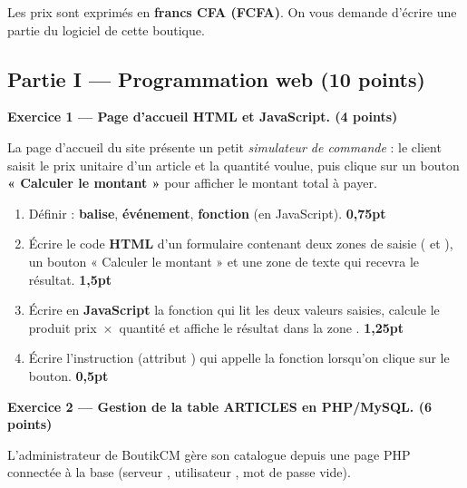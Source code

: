 \noindent Les prix sont exprimés en \textbf{francs CFA (FCFA)}. On vous demande
d'écrire une partie du logiciel de cette boutique.

\subsection*{Partie I — Programmation web \hfill (10 points)}

\textbf{Exercice 1 — Page d'accueil HTML et JavaScript. \hfill (4 points)}

\smallskip
La page d'accueil du site présente un petit \emph{simulateur de commande} : le client
saisit le prix unitaire d'un article et la quantité voulue, puis clique sur un bouton
\textbf{« Calculer le montant »} pour afficher le montant total à payer.

\begin{enumerate}[label=\textbf{\arabic*-},leftmargin=2.2em]
\item Définir : \textbf{balise}, \textbf{événement}, \textbf{fonction} (en JavaScript). \hfill \textbf{0,75pt}
\item Écrire le code \textbf{HTML} d'un formulaire contenant deux zones de saisie
( et ), un bouton « Calculer le montant » et une zone de
texte  qui recevra le résultat. \hfill \textbf{1,5pt}
\item Écrire en \textbf{JavaScript} la fonction  qui lit les deux
valeurs saisies, calcule le produit prix~$\times$~quantité et affiche le résultat dans
la zone . \hfill \textbf{1,25pt}
\item Écrire l'instruction (attribut ) qui appelle la fonction
 lorsqu'on clique sur le bouton. \hfill \textbf{0,5pt}
\end{enumerate}

\bigskip
\textbf{Exercice 2 — Gestion de la table ARTICLES en PHP/MySQL. \hfill (6 points)}

\smallskip
L'administrateur de BoutikCM gère son catalogue depuis une page PHP connectée à la base
 (serveur , utilisateur , mot de passe vide).

